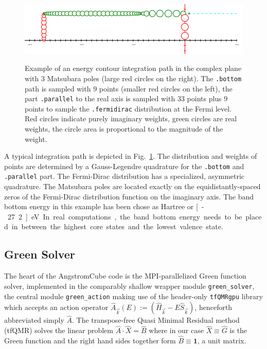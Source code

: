 \documentclass[oribibl]{llncs}
\newcommand{\ttt}[1]{\texttt{#1}}
\newcommand{\fullcodename}{AngstromCube}
\begin{document}
\begin{figure}[t]
	\centering
	\includegraphics[width=.99\textwidth]{fig/energy_contour-9-33-9-3}
	\label{fig:energy-contour}
	\caption{Example of an energy contour integration path in the complex plane with $3$ Matsubara poles (large red circles on the right).
	The \ttt{.bottom} path is sampled with $9$ points (smaller red circles on the left),
	the part \ttt{.parallel} to the real axis is sampled with $33$ points plus
	$9$ points to sample the \ttt{.fermidirac} distribution at the Fermi level.
	Red circles indicate purely imaginary weights, green circles are real weights,
	the circle area is proportional to the magnitude of the weight.
	}
\end{figure}

\noindent
A typical integration path is depicted in Fig.~\ref{fig:energy-contour}. 
The distribution and weights of points are determined by a Gauss-Legendre quadrature for the \ttt{.bottom} and \ttt{.parallel} part.
The Fermi-Dirac distribution has a specialized, asymmetric quadrature.
The Matsubara poles are located exactly on the equidistantly-spaced zeros of the Fermi-Dirac distribution function on the imaginary axis.
The band bottom energy in this example has been chose as \unit[-1]{Hartree} or \unit[-27.2]{eV}.
In real computations, the band bottom energy needs to be placed in between the highest core states and the lowest valence state.

\subsection{Green Solver}\label{sec:green-solver}
The heart of the \fullcodename{} code is the \ac{MPI}-parallelized Green function solver,
implemented in the comparably shallow wrapper module \ttt{green\_solver}, 
the central module \ttt{green\_action} making use of the header-only \ttt{tfQMRgpu} library \cite{tfQMRgpu-preprint}
which accepts an action operator $\hat A_{\vec k}(E) := (\hat H_{\vec k} - E\hat S_{\vec k})$, henceforth abbreviated simply $\hat A$.
The transpose-free Quasi Minimal Residual method (tfQMR) solves the linear problem $\hat A \cdot \hat X = \hat B$ where in our case $\hat X \equiv \hat G$ is the Green function and the right hand sides together form $\hat B \equiv \mathbf{1}$, a unit matrix.
\end{document}

